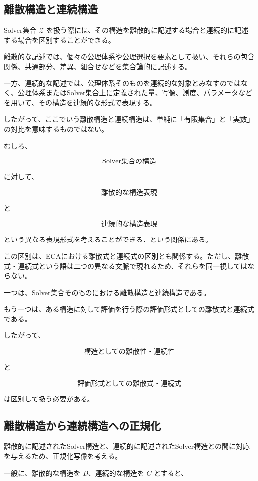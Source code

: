 \subsection{離散構造と連続構造}

Solver集合 $\mathcal{Z}$ を扱う際には、その構造を離散的に記述する場合と連続的に記述する場合を区別することができる。

離散的な記述では、個々の公理体系や公理選択を要素として扱い、それらの包含関係、共通部分、差異、組合せなどを集合論的に記述する。

一方、連続的な記述では、公理体系そのものを連続的な対象とみなすのではなく、公理体系またはSolver集合上に定義された量、写像、測度、パラメータなどを用いて、その構造を連続的な形式で表現する。

したがって、ここでいう離散構造と連続構造は、単純に「有限集合」と「実数」の対比を意味するものではない。

むしろ、

\[
\text{Solver集合の構造}
\]

に対して、

\[
\text{離散的な構造表現}
\]

と

\[
\text{連続的な構造表現}
\]

という異なる表現形式を考えることができる、という関係にある。

この区別は、ECAにおける離散式と連続式の区別とも関係する。ただし、離散式・連続式という語は二つの異なる文脈で現れるため、それらを同一視してはならない。

一つは、Solver集合そのものにおける離散構造と連続構造である。

もう一つは、ある構造に対して評価を行う際の評価形式としての離散式と連続式である。

したがって、

\[
\boxed{
\text{構造としての離散性・連続性}
}
\]

と

\[
\boxed{
\text{評価形式としての離散式・連続式}
}
\]

は区別して扱う必要がある。

\subsection{離散構造から連続構造への正規化}

離散的に記述されたSolver構造と、連続的に記述されたSolver構造との間に対応を与えるため、正規化写像を考える。

一般に、離散的な構造を $D$、連続的な構造を $C$ とすると、

